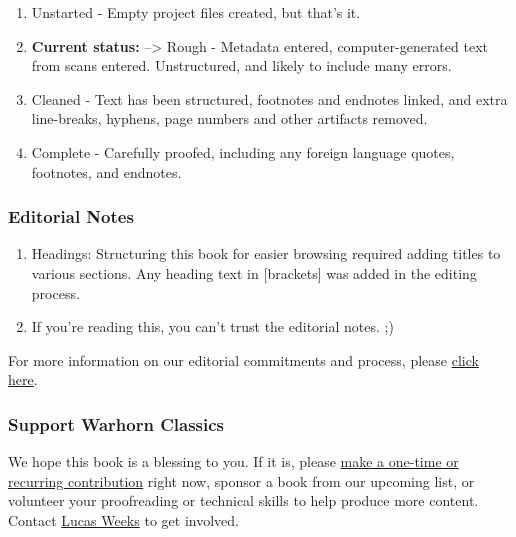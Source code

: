 \documentclass[
]{book}
\providecommand{\tightlist}{%
  \setlength{\itemsep}{0pt}\setlength{\parskip}{0pt}}
\begin{document}
\begin{enumerate}
\def\labelenumi{\arabic{enumi}.}
\setcounter{enumi}{-1}
\tightlist
\item
  Unstarted - Empty project files created, but that's it.
\item
  \textbf{Current status:} --\textgreater{} Rough - Metadata entered, computer-generated text from scans entered. Unstructured, and likely to include many errors.
\item
  Cleaned - Text has been structured, footnotes and endnotes linked, and extra line-breaks, hyphens, page numbers and other artifacts removed.
\item
  Complete - Carefully proofed, including any foreign language quotes, footnotes, and endnotes.
\end{enumerate}

\hypertarget{editorial-notes}{%
\subsubsection*{Editorial Notes}\label{editorial-notes}}

\begin{enumerate}
\def\labelenumi{\arabic{enumi}.}
\tightlist
\item
  Headings: Structuring this book for easier browsing required adding titles to various sections. Any heading text in {[}brackets{]} was added in the editing process.
\item
  If you're reading this, you can't trust the editorial notes. ;)
\end{enumerate}

For more information on our editorial commitments and process, please \href{https://classics.warhornmedia.com/editorial}{click here}.

\hypertarget{support-warhorn-classics}{%
\subsubsection*{Support Warhorn Classics}\label{support-warhorn-classics}}

We hope this book is a blessing to you. If it is, please \href{https://warhornmedia.com/give}{make a one-time or recurring contribution} right now, sponsor a book from our upcoming list, or volunteer your proofreading or technical skills to help produce more content. Contact \href{mailto:lucas@beggarsborn.com}{Lucas Weeks} to get involved.
\end{document}
